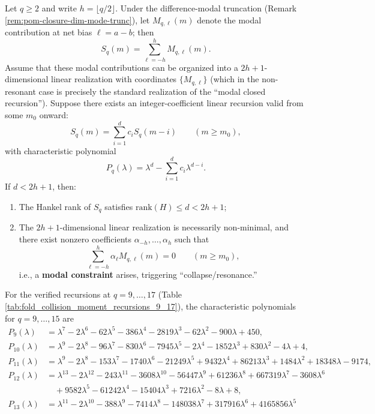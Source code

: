 \begin{theorem}\label{thm:pom-moment-resonance}
Let \(q\ge 2\) and write \(h=\lfloor q/2\rfloor\). Under the difference-modal truncation (Remark \ref{rem:pom-closure-dim-mode-trunc}), let \(M_{q,\ell}(m)\) denote the modal contribution at net bias \(\ell=a-b\); then
$$
S_q(m)=\sum_{\ell=-h}^{h} M_{q,\ell}(m).
$$
Assume that these modal contributions can be organized into a \(2h+1\)-dimensional linear realization with coordinates \(\{M_{q,\ell}\}\) (which in the non-resonant case is precisely the standard realization of the ``modal closed recursion'').
Suppose there exists an integer-coefficient linear recursion valid from some \(m_0\) onward:
$$
S_q(m)=\sum_{i=1}^{d} c_i S_q(m-i)\qquad(m\ge m_0),
$$
with characteristic polynomial
$$
P_q(\lambda)=\lambda^d-\sum_{i=1}^d c_i\lambda^{d-i}.
$$
If \(d<2h+1\), then:
\begin{enumerate}
  \item The Hankel rank of \(S_q\) satisfies \(\mathrm{rank}(H)\le d<2h+1\);
  \item The \(2h+1\)-dimensional linear realization is necessarily non-minimal, and there exist nonzero coefficients \(\alpha_{-h},\dots,\alpha_h\) such that
  $$
  \sum_{\ell=-h}^{h}\alpha_\ell M_{q,\ell}(m)=0\qquad(m\ge m_0),
  $$
  i.e., a \textbf{modal constraint} arises, triggering ``collapse/resonance.''
\end{enumerate}
For the verified recursions at \(q=9,\dots,17\) (Table \ref{tab:fold_collision_moment_recursions_9_17}), the characteristic polynomials for \(q=9,\dots,15\) are
$$
\begin{aligned}
P_9(\lambda)&=\lambda^7-2\lambda^6-62\lambda^5-386\lambda^4-2819\lambda^3-62\lambda^2-900\lambda+450,\\
P_{10}(\lambda)&=\lambda^9-2\lambda^8-96\lambda^7-830\lambda^6-7945\lambda^5-2\lambda^4-1852\lambda^3+830\lambda^2-4\lambda+4,\\
P_{11}(\lambda)&=\lambda^9-2\lambda^8-153\lambda^7-1740\lambda^6-21249\lambda^5+9432\lambda^4+86213\lambda^3+1484\lambda^2+18348\lambda-9174,
\\
P_{12}(\lambda)&=\lambda^{13}-2\lambda^{12}-243\lambda^{11}-3608\lambda^{10}-56447\lambda^9+61236\lambda^8+667319\lambda^7-3608\lambda^6\\
&\quad+9582\lambda^5-61242\lambda^4-15404\lambda^3+7216\lambda^2-8\lambda+8,\\
P_{13}(\lambda)&=\lambda^{11}-2\lambda^{10}-388\lambda^9-7414\lambda^8-148038\lambda^7+317916\lambda^6+4165856\lambda^5\\

\end{aligned}$$
\end{theorem}
